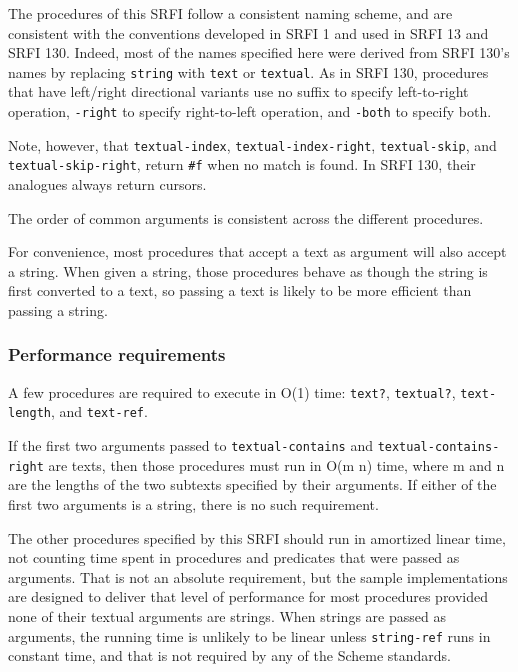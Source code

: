 The procedures of this SRFI follow a consistent naming scheme, and are
consistent with the conventions developed in SRFI 1 and used in SRFI 13
and SRFI 130. Indeed, most of the names specified here were derived from
SRFI 130's names by replacing \texttt{string} with \texttt{text} or
\texttt{textual}. As in SRFI 130, procedures that have left/right
directional variants use no suffix to specify left-to-right operation,
\texttt{-right} to specify right-to-left operation, and \texttt{-both}
to specify both.

Note, however, that \texttt{textual-index},
\texttt{textual-index-right}, \texttt{textual-skip}, and
\texttt{textual-skip-right}, return \texttt{\#f} when no match is found.
In SRFI 130, their analogues always return cursors.

The order of common arguments is consistent across the different
procedures.

For convenience, most procedures that accept a text as argument will
also accept a string. When given a string, those procedures behave as
though the string is first converted to a text, so passing a text is
likely to be more efficient than passing a string.

\subsubsection{{Performance requirements}}\label{performance-requirements}

A few procedures are required to execute in O(1) time: \texttt{text?},
\texttt{textual?}, \texttt{text-length}, and \texttt{text-ref}.

If the first two arguments passed to \texttt{textual-contains} and
\texttt{textual-contains-right} are texts, then those procedures must
run in O(m n) time, where m and n are the lengths of the two subtexts
specified by their arguments. If either of the first two arguments is a
string, there is no such requirement.

The other procedures specified by this SRFI should run in amortized
linear time, not counting time spent in procedures and predicates that
were passed as arguments. That is not an absolute requirement, but the
sample implementations are designed to deliver that level of performance
for most procedures provided none of their textual arguments are
strings. When strings are passed as arguments, the running time is
unlikely to be linear unless \texttt{string-ref} runs in constant time,
and that is not required by any of the Scheme standards.

